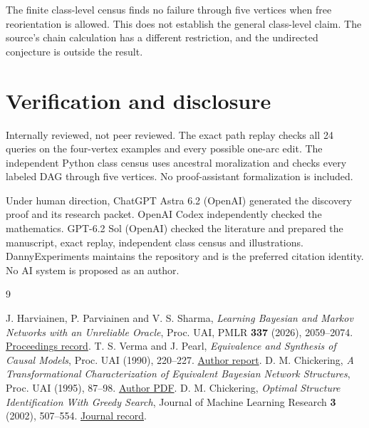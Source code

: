 \documentclass[11pt,a4paper]{amsart}
\begin{document}
The finite class-level census finds no failure through five
vertices when free reorientation is allowed. This does not
establish the general class-level claim. The source's chain
calculation has a different restriction, and the undirected
conjecture is outside the result.

\section{Verification and disclosure}

Internally reviewed, not peer reviewed. The exact path replay
checks all 24 queries on the four-vertex examples and every
possible one-arc edit. The independent Python class census
uses ancestral moralization and checks every labeled DAG
through five vertices. No proof-assistant formalization is
included.

Under human direction, ChatGPT Astra 6.2 (OpenAI) generated the
discovery proof and its research packet. OpenAI Codex independently
checked the mathematics. GPT-6.2 Sol (OpenAI) checked the literature
and prepared the manuscript, exact replay, independent class
census and illustrations. DannyExperiments maintains the repository
and is the preferred citation identity. No AI system is proposed
as an author.

\begin{thebibliography}{9}
\raggedright
{}
J. Harviainen, P. Parviainen and V. S. Sharma,
\emph{Learning Bayesian and Markov Networks with an Unreliable
Oracle}, Proc. UAI, PMLR \textbf{337} (2026), 2059--2074.
\href{https://proceedings.mlr.press/v337/harviainen26a.html}{Proceedings record}.
T. S. Verma and J. Pearl, \emph{Equivalence and Synthesis of
Causal Models}, Proc. UAI (1990), 220--227.
\href{https://ftp.cs.ucla.edu/tech-report/1991-reports/910020.pdf}{Author report}.
D. M. Chickering, \emph{A Transformational Characterization of
Equivalent Bayesian Network Structures}, Proc. UAI (1995), 87--98.
\href{https://maxchickering.com/publications/uai95.pdf}{Author PDF}.
D. M. Chickering, \emph{Optimal Structure Identification With
Greedy Search}, Journal of Machine Learning Research \textbf{3}
(2002), 507--554.
\href{https://jmlr.org/papers/v3/chickering02b.html}{Journal record}.
\end{thebibliography}
\end{document}
